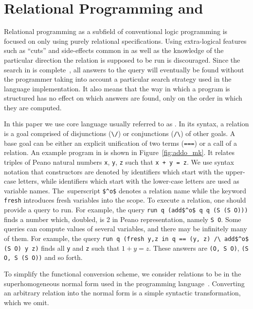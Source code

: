 \section{Relational Programming and \mk}
\label{sec:mk}






Relational programming as a subfield of conventional logic programming is focused on only using purely relational specifications.
Using extra-logical features such as ``cuts'' and side-effects common in \prolog as well as the knowledge of the particular direction the relation is supposed to be run is discouraged.
Since the search in \mk is complete~\cite{kiselyov2005backtracking,rozplokhas2020certified}, all answers to the query will eventually be found without the programmer taking into account a particular search strategy used in the language implementation.
It also means that the way in which a program is structured has no effect on which answers are found, only on the order in which they are computed.

In this paper we use core \mk language usually referred to as \micro.
In its syntax, a relation is a goal comprised of disjunctions (\lstinline{\/}) or conjunctions (\lstinline{/\}) of other goals.
A base goal can be either an explicit unification of two terms (\lstinline{===}) or a call of a relation.
An example program in \mk is shown in Figure~\ref{fig:addo_mk}.
It relates triples of Peano natural numbers \lstinline{x}, \lstinline{y}, \lstinline{z} such that \lstinline{x + y = z}.
We use syntax notation that constructors are denoted by identifiers which start with the upper-case letters, while identifiers which start with the lower-case letters are used as variable names.
The~superscript \lstinline{$^o$} denotes a relation name while the keyword \lstinline{fresh} introduces fresh variables into the scope.
To execute a relation, one should provide a query to run.
For example, the query \lstinline{run q (add$^o$ q q (S (S O)))} finds a number which, doubled, is 2 in Peano representation, namely \lstinline{S O}.
Some queries can compute values of several variables, and there may be infinitely many of them.
For example, the query \lstinline{run q (fresh y,z in q == (y, z) /\ add$^o$ (S O) y z)} finds all \lstinline{y} and \lstinline{z} such that $1 + y = z$.
These answers are \lstinline{(O, S O)}, \lstinline{(S O, S (S O))} and so forth.


To simplify the functional conversion scheme, we consider \mk relations to be in the superhomogeneous normal form used in the \merc programming language~\cite{somogyi1996execution}.
Converting an arbitrary \mk relation into the normal form is a simple syntactic transformation, which we omit.

